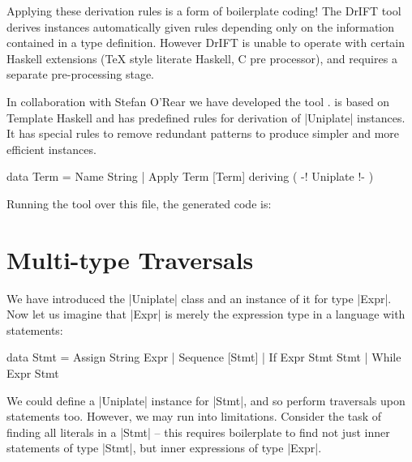 Applying these derivation rules is a form of boilerplate coding! The DrIFT tool \citep{drift} derives instances automatically given rules depending only on the information contained in a type definition. However DrIFT is unable to operate with certain Haskell extensions ({\TeX} style literate Haskell, C pre processor), and requires a separate pre-processing stage.

In collaboration with Stefan O'Rear we have developed the \derive{} tool \citep{derive}. \derive{} is based on Template Haskell \citep{template_haskell} and has predefined rules for derivation of |Uniplate| instances. It has special rules to remove redundant patterns to produce simpler and more efficient instances.

\begin{example}
\begin{code}
data Term  =  Name String
           |  Apply Term [Term]
              deriving ( {-! \textsf{Uniplate} !-} )
\end{code}

Running the \derive{} tool over this file, the generated code is:

\end{example}


\section{Multi-type Traversals}
\label{sec:use_playex}

We have introduced the |Uniplate| class and an instance of it for type |Expr|. Now let us imagine that |Expr| is merely the expression type in a language with statements:

\begin{code}
data Stmt  =  Assign    String  Expr
           |  Sequence  [Stmt]
           |  If        Expr    Stmt Stmt
           |  While     Expr    Stmt
\end{code}

We could define a |Uniplate| instance for |Stmt|, and so perform traversals upon statements too. However, we may run into limitations. Consider the task of finding all literals in a |Stmt| -- this requires boilerplate to find not just inner statements of type |Stmt|, but inner expressions of type |Expr|.

